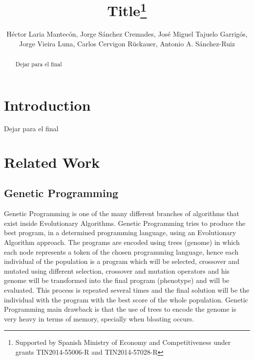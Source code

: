 \documentclass{llncs}
\title{Title\thanks{Supported by Spanish Ministry of Economy and Competitiveness under grants TIN2014-55006-R and TIN2014-57028-R}
}
\author{Héctor Laria Mantecón, Jorge Sánchez Cremades, José Miguel Tajuelo Garrigós, Jorge Vieira Luna, Carlos Cervigon Rückauer, Antonio A. S\'{a}nchez-Ruiz}
\institute{
	Dep. Ingenier\'{\i}a del Software e Inteligencia Artificial \\
	Universidad Complutense de Madrid (Spain) \\
	\email{\{hlaria, jorsan06, jtajuelo, jovieira, ccervigon, antsanch\}@ucm.es}
}
\begin{document}
\maketitle
%
%
\begin{abstract}
{\color{red}
Dejar para el final}

{\color{red}}
\end{abstract}

%
\section{Introduction}
\label{sec:intro}
%

{\color{red}Dejar para el final}

%
\section{Related Work}
\label{sec:relatedWork}
%

\subsection{Genetic Programming}
Genetic Programming is one of the many different branches of algorithms that exist inside Evolutionary Algorithms. \cite{araujo_cervigon}
Genetic Programming tries to produce the best program, in a determined programming language, using an Evolutionary Algorithm approach. The programs are encoded using trees (genome)  in which each node represents a token of the chosen programming language, hence each individual of the population is a program which will be selected, crossover and mutated using different selection, crossover and mutation operators and his genome will be transformed into the final program (phenotype) and will be evaluated. This process is repeated several times and the final solution will be the individual with the program with the best score of the whole population.\cite{araujo_cervigon}
Genetic Programming main drawback is that the use of trees to encode the genome is very heavy in terms of memory, specially when bloating occurs.\cite{Poli2003}
\end{document}
